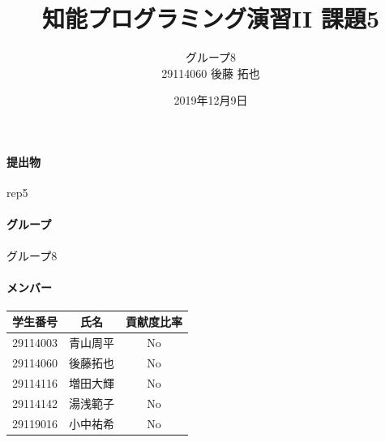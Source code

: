 \documentclass[uplatex,12pt]{jsarticle}
\title{知能プログラミング演習II 課題5}
\author{グループ8\\
  29114060 後藤 拓也\\
}
\date{2019年12月9日}
\begin{document}
\maketitle

\paragraph{提出物} rep5
\paragraph{グループ} グループ8

\paragraph{メンバー}
\begin{tabular}{|c|c|c|}
  \hline
  学生番号&氏名&貢献度比率\\
  \hline\hline
  29114003&青山周平&No\\
  \hline
  29114060&後藤拓也&No\\
  \hline
  29114116&増田大輝&No\\
  \hline
  29114142&湯浅範子&No\\
  \hline
  29119016&小中祐希&No\\
  \hline
\end{tabular}
\end{document}
